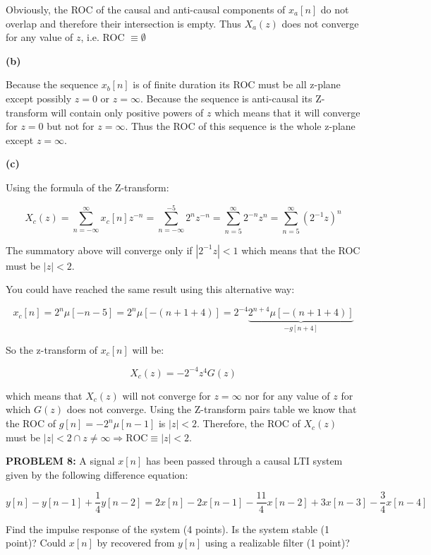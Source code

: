 \documentclass[a4paper,11pt,oneside]{article}
\begin{document}
Obviously, the ROC of the causal and anti-causal components of $x_a[n]$ do not overlap and therefore their intersection is empty. Thus $X_a(z)$ does not converge for any value of $z$, i.e. ROC $\equiv \emptyset$

\textbf{(b)}

Because the sequence $x_b[n]$ is of finite duration its ROC must be all z-plane except possibly $z=0$ or $z=\infty$. Because the sequence is anti-causal its Z-transform will contain only positive powers of $z$ which means that it will converge for $z=0$ but not for $z=\infty$. Thus the ROC of this sequence is the whole z-plane except $z=\infty$.

\textbf{(c)}

Using the formula of the Z-transform:

\[
X_c(z)=\sum_{n=-\infty}^{\infty}x_c[n]z^{-n}=\sum_{n=-\infty}^{-5}2^nz^{-n}=\sum_{n=5}^{\infty}2^{-n}z^n=\sum_{n=5}^{\infty}(2^{-1}z)^n
\]

The summatory above will converge only if $|2^{-1}z|<1$ which means that the ROC must be $|z|<2$.

You could have reached the same result using this alternative way:

\[
x_c[n]=2^n\mu[-n-5]=2^n\mu[-(n+1+4)]=2^{-4}\underbrace{2^{n+4}\mu[-(n+1+4)]}_{-g[n+4]}
\]

So the z-transform of $x_c[n]$ will be:

\[
X_c(z)=-2^{-4}z^{4}G(z)
\]

which means that $X_c(z)$ will not converge for $z=\infty$ nor for any value of $z$ for which $G(z)$ does not converge. Using the Z-transform pairs table we know that the ROC of $g[n]=-2^n\mu[n-1]$ is $|z|<2$. Therefore, the ROC of $X_c(z)$ must be $|z|<2 \cap z\neq \infty \Rightarrow \textrm{ROC} \equiv |z|<2$.

\vspace{1cm}





\textbf{PROBLEM 8:} A signal $x[n]$ has been passed through a causal LTI system given by the following difference equation:

\[
y[n]-y[n-1]+\frac{1}{4}y[n-2]=2x[n]-2x[n-1]-\frac{11}{4}x[n-2]+3x[n-3]-\frac{3}{4}x[n-4]
\]

Find the impulse response of the system (4 points). Is the system stable (1 point)? Could $x[n]$ by recovered from $y[n]$ using a realizable filter (1 point)?
\end{document}
